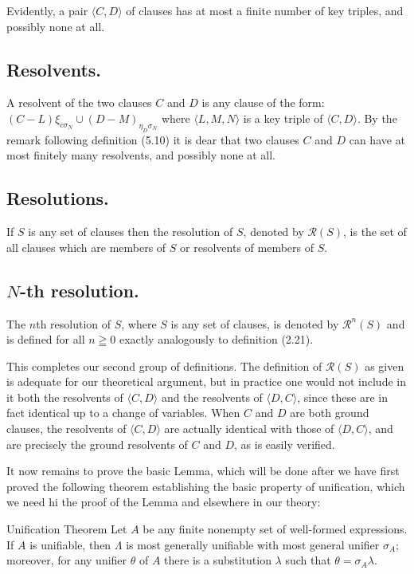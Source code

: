 \documentclass[8pt]{extarticle}
\begin{document}
Evidently, a pair $\langle C, D\rangle$ of clauses has at most a finite number of key triples, and possibly none at all.

\subsection{Resolvents.}
A resolvent of the two clauses $C$ and $D$ is any clause of the
form: $(C - L)\xi_{c\sigma_N} \cup (D - M)_{\eta_D\sigma_N}$ where $\langle L, M, N\rangle$ is a key triple of $\langle C, D\rangle$.
By the remark following definition (5.10) it is dear that two clauses $C$ and $D$ can have at most finitely many resolvents, and possibly none at all.

\subsection{Resolutions.}
If $S$ is any set of clauses then the resolution of $S$, denoted
by $\mathscr{R}(S)$, is the set of all clauses which are members of $S$ or resolvents of members of $S$.

\subsection{$N$-th resolution.}
The $n$\-th resolution of $S$, where $S$ is any set of clauses,
is denoted by $\mathscr{R}^n(S)$ and is defined for all $n \geqq 0$ exactly analogously to definition (2.21).

This completes our second group of definitions. The definition of $\mathscr{R}(S)$ as given is adequate for our theoretical argument, but in practice one would not include in it both the resolvents of $\langle C, D\rangle$ and the resolvents of $\langle D, C\rangle$, since these are in fact identical up to a change of variables. When $C$ and $D$ are both ground clauses, the resolvents of $\langle C, D\rangle$ are actually identical with those of $\langle D, C\rangle$, and are precisely the ground resolvents of $C$ and $D$, as is easily verified.

It now remains to prove the basic Lemma, which will be done after we have
first proved the following theorem establishing the basic property of unification, which we need hi the proof of the Lemma and elsewhere in our theory: 


\begin{unificationTheorem}{Unification Theorem}\label{unificationTheorem}
Let $A$ be any finite nonempty set of well-formed expressions. If $A$ is unifiable, then $\Lambda$ is most generally unifiable with most general
unifier $\sigma_A$; moreover, for any unifier $\theta$ of $A$ there is a substitution $\lambda$ such that
$\theta = \sigma_A\lambda$.
\end{unificationTheorem}
\end{document}

